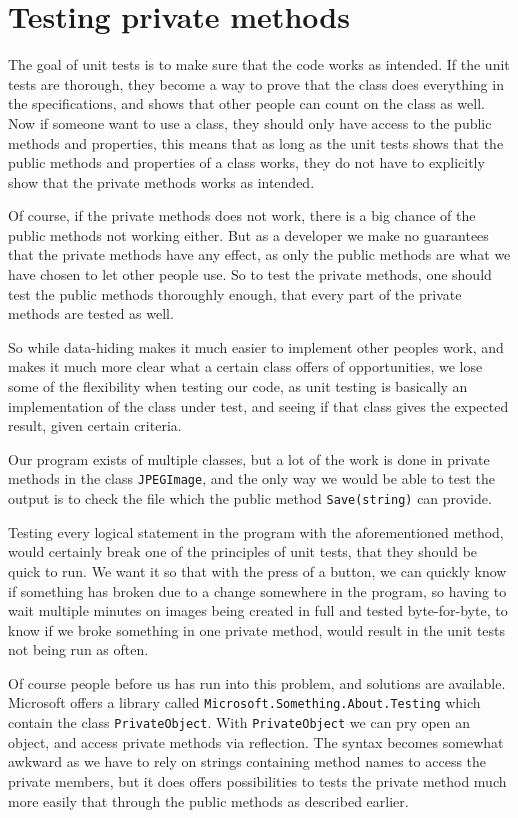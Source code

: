 \section{Testing private methods}
The goal of unit tests is to make sure that the code works as intended.
If the unit tests are thorough, they become a way to prove that the class does everything in the specifications, and shows that other people can count on the class as well.
Now if someone want to use a class, they should only have access to the public methods and properties, this means that as long as the unit tests shows that the public methods and properties of a class works, they do not have to explicitly show that the private methods works as intended.

Of course, if the private methods does not work, there is a big chance of the public methods not working either.
But as a developer we make no guarantees that the private methods have any effect, as only the public methods are what we have chosen to let other people use. 
So to test the private methods, one should test the public methods thoroughly enough, that every part of the private methods are tested as well. 

So while data-hiding makes it much easier to implement other peoples work, and makes it much more clear what a certain class offers of opportunities, we lose some of the flexibility when testing our code, as unit testing is basically an implementation of the class under test, and seeing if that class gives the expected result, given certain criteria. 

Our program exists of multiple classes, but a lot of the work is done in private methods in the class \lstinline|JPEGImage|, and the only way we would be able to test the output is to check the file which the public method \lstinline|Save(string)| can provide.

Testing every logical statement in the program with the aforementioned method, would certainly break one of the principles of unit tests, that they should be quick to run.
We want it so that with the press of a button, we can quickly know if something has broken due to a change somewhere in the program, so having to wait multiple minutes on images being created in full and tested byte-for-byte, to know if we broke something in one private method, would result in the unit tests not being run as often. 

Of course people before us has run into this problem, and solutions are available.
Microsoft offers a library called \lstinline|Microsoft.Something.About.Testing| which contain the class \lstinline|PrivateObject|.
With \lstinline|PrivateObject| we can pry open an object, and access private methods via reflection.
The syntax becomes somewhat awkward as we have to rely on strings containing method names to access the private members, but it does offers possibilities to tests the private method much more easily that through the public methods as described earlier.